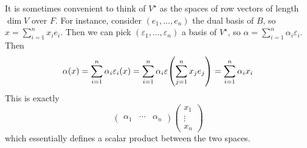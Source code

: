 \begin{remark}
	It is sometimes convenient to think of \( V^\star \) as the spaces of row vectors of length \( \dim V \) over \( F \).
	For instance, consider \( (e_1, \dots, e_n) \) the dual basis of \( B \), so \( x = \sum_{i=1}^n x_i e_i \).
	Then we can pick \( (\varepsilon_1, \dots, \varepsilon_n) \) a basis of \( V^\star \), so \( \alpha = \sum_{i=1}^n \alpha_i \varepsilon_i \).
	Then
	\[
		\alpha(x) = \sum_{i=1}^n \alpha_i \varepsilon_i(x) = \sum_{i=1}^n \alpha_i \varepsilon\qty(\sum_{j=1}^n x_j e_j) = \sum_{i=1}^n \alpha_i x_i
	\]
	This is exactly
	\[
		\begin{pmatrix} \alpha_1 & \cdots & \alpha_n \end{pmatrix} \begin{pmatrix} x_1 \\ \vdots \\ x_n \end{pmatrix}
	\]
	which essentially defines a scalar product between the two spaces.
\end{remark}

